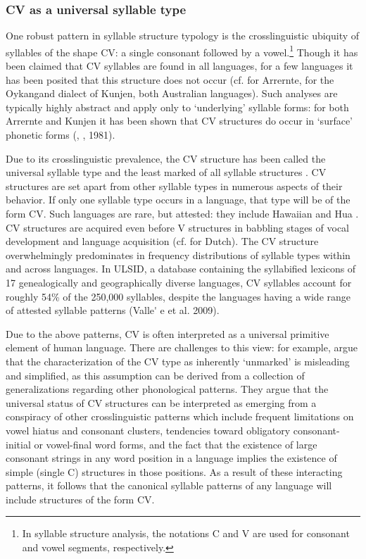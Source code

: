 \subsubsection{{CV} {as} {a} {universal} {syllable} {type}}\label{sec:1.1.2.1}

\textsf{} One robust pattern in syllable structure typology is the crosslinguistic ubiquity of syllables of the shape CV: a single consonant followed by a vowel.\footnote{ \textrm{In syllable structure analysis, the notations C and V are used for consonant and vowel segments, respectively.}} Though it has been claimed that CV syllables are found in all languages, for a few languages it has been posited that this structure does not occur (cf. \citealt{BreenPensalfini1999} for Arrernte, \citealt{Sommer1969} for the Oykangand dialect of Kunjen, both Australian languages). Such analyses are typically highly abstract and apply only to ‘underlying’ syllable forms: for both Arrernte and Kunjen it has been shown that CV structures do occur in ‘surface’ phonetic forms (\citealt{Anderson2000}, \citealt{Sommer1969}, 1981).

  Due to its crosslinguistic prevalence, the CV structure has been called the universal syllable type and the least marked of all syllable structures \citep{Zec2007}. CV structures are set apart from other syllable types in numerous aspects of their behavior. If only one syllable type occurs in a language, that type will be of the form CV. Such languages are rare, but attested: they include Hawaiian \citep{Maddieson2011} and Hua \citep{Blevins1995}. CV structures are acquired even before V structures in babbling stages of vocal development and language acquisition (cf. \citealt{LeveltEtAl2000} for Dutch). The CV structure overwhelmingly predominates in frequency distributions of syllable types within and across languages. In ULSID, a database containing the syllabified lexicons of 17 genealogically and geographically diverse languages, CV syllables account for roughly 54\% of the 250,000 syllables, despite the languages having a wide range of attested syllable patterns (Valle\'{} e et al. 2009).

  Due to the above patterns, CV is often interpreted as a universal primitive element of human language. There are challenges to this view: for example, \citet{BellHooper1978} argue that the characterization of the CV type as inherently ‘unmarked’ is misleading and simplified, as this assumption can be derived from a collection of generalizations regarding other phonological patterns. They argue that the universal status of CV structures can be interpreted as emerging from a conspiracy of other crosslinguistic patterns which include frequent limitations on vowel hiatus and consonant clusters, tendencies toward obligatory consonant-initial or vowel-final word forms, and the fact that the existence of large consonant strings in any word position in a language implies the existence of simple (single C) structures in those positions. As a result of these interacting patterns, it follows that the canonical syllable patterns of any language will include structures of the form CV.


